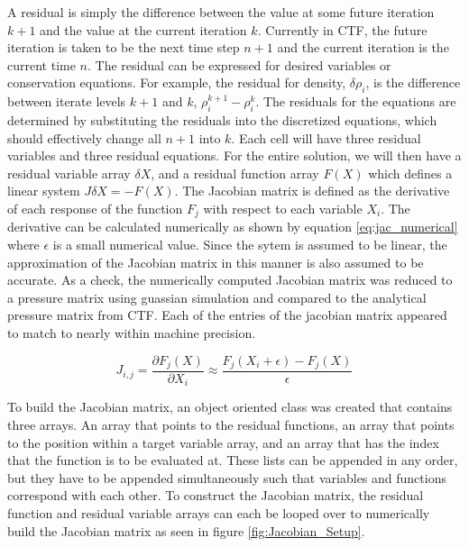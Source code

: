 \documentclass{mc2015}
\begin{document}
	A residual is simply the difference between the value at some future iteration
    $k+1$ and the value at the current iteration $k$. Currently in CTF, the
    future iteration is taken to be the next time step $n+1$ and the
    current iteration is the current time $n$. The residual can be expressed for
    desired variables or conservation equations. For example, the residual for
    density, $\delta \rho_{i}$, is the difference between iterate levels $k+1$
    and $k$, $\rho^{k+1}_{i} - \rho^{k}_{i}$. The residuals for the equations
    are determined by substituting the residuals into the discretized equations,
    which should effectively change all $n+1$ into $k$. Each cell will have
    three residual variables and three residual equations. For the entire
    solution, we will then have a residual variable array $\delta X$, and a
    residual function array $F(X)$ which defines a linear system $J \delta X = -
    F(X)$. The Jacobian matrix is defined as the derivative of each response of
    the function $F_{j}$ with respect to each variable $X_{i}$.
    The derivative can be calculated numerically as shown by equation
    \eqref{eq:jac_numerical} where $\epsilon$ is a small numerical value.
    Since the sytem is assumed to be linear, the approximation of the Jacobian
    matrix in this manner is also assumed to be accurate. As a check, the
    numerically computed Jacobian matrix was reduced to a pressure matrix using
    guassian simulation and compared to the analytical pressure matrix from CTF.
    Each of the entries of the jacobian matrix appeared to match to nearly
    within machine precision.
    
    \begin{equation}
    	\label{eq:jac_numerical}
    	J_{i,j}=\frac{ \partial F_{j}(X)}{\partial X_{i}}
    	      \approx \frac{F_{j}(X_{i}+\epsilon)-F_{j}(X)}{\epsilon}
    \end{equation}
    
	To build the Jacobian matrix, an object oriented class was created that
    contains three arrays. An array that points to the residual functions, an
    array that points to the position within a target variable array, and an
    array that has the index that the function is to be evaluated at. These
    lists can be appended in any order, but they have to be appended
    simultaneously such that variables and functions correspond with each
    other. To construct the Jacobian matrix, the residual function and
    residual variable arrays can each be looped over to numerically build the
    Jacobian matrix as seen in figure \ref{fig:Jacobian_Setup}. 
    
\end{document}

